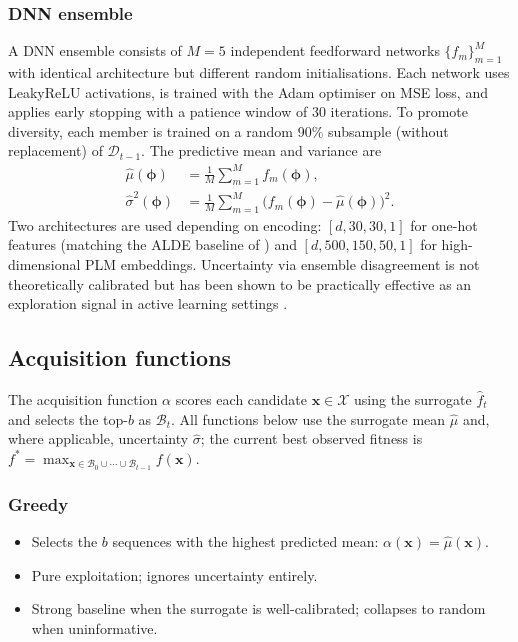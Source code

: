 \subsubsection{DNN ensemble}

A DNN ensemble consists of $M = 5$ independent feedforward networks $\{f_m\}_{m=1}^M$ with identical architecture but different random initialisations. Each network uses LeakyReLU activations, is trained with the Adam optimiser on MSE loss, and applies early stopping with a patience window of 30 iterations. To promote diversity, each member is trained on a random 90\% subsample (without replacement) of $\mathcal{D}_{t-1}$. The predictive mean and variance are
\begin{align}
\hat{\mu}(\boldsymbol{\phi}) &= \frac{1}{M}\sum_{m=1}^{M} f_m(\boldsymbol{\phi}), \\
\hat{\sigma}^2(\boldsymbol{\phi}) &= \frac{1}{M}\sum_{m=1}^{M}\bigl(f_m(\boldsymbol{\phi}) - \hat{\mu}(\boldsymbol{\phi})\bigr)^2.
\end{align}
Two architectures are used depending on encoding: $[d, 30, 30, 1]$ for one-hot features (matching the ALDE baseline of ) and $[d, 500, 150, 50, 1]$ for high-dimensional PLM embeddings. Uncertainty via ensemble disagreement is not theoretically calibrated but has been shown to be practically effective as an exploration signal in active learning settings .

\subsection{Acquisition functions}
The acquisition function $\alpha$ scores each candidate $\mathbf{x} \in \mathcal{X}$ using the surrogate $\hat{f}_t$ and selects the top-$b$ as $\mathcal{B}_t$.
All functions below use the surrogate mean $\hat{\mu}$ and, where applicable, uncertainty $\hat{\sigma}$; the current best observed fitness is $f^* = \max_{\mathbf{x} \in \mathcal{B}_0 \cup \cdots \cup \mathcal{B}_{t-1}} f(\mathbf{x})$.

\subsubsection{Greedy}
\begin{itemize}
  \item Selects the $b$ sequences with the highest predicted mean: $\alpha(\mathbf{x}) = \hat{\mu}(\mathbf{x})$.
  \item Pure exploitation; ignores uncertainty entirely.
  \item Strong baseline when the surrogate is well-calibrated; collapses to random when uninformative.
\end{itemize}

